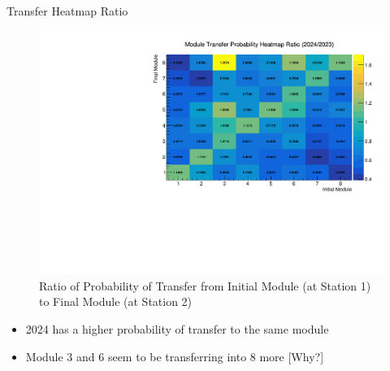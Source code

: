 \begin{frame}{Transfer Heatmap Ratio }
    \begin{figure}
        \includegraphics[width=0.86\linewidth]{./ModuleLevelPlots/st0_module_number vs st1_module_number_prob_ratio.pdf}
        \caption{Ratio of Probability of Transfer from Initial Module (at Station 1) to Final Module (at Station 2) }
    \end{figure}
    \begin{itemize}
        \small
        \item 2024 has a higher probability of transfer to the same module
        \item Module 3 and 6 seem to be transferring into 8 more [Why?]
    \end{itemize}

\end{frame}


